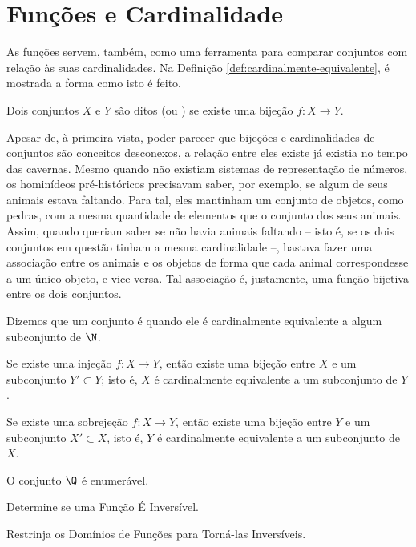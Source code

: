 \section{Funções e Cardinalidade}

As funções servem, também, como uma ferramenta para comparar conjuntos com relação às suas cardinalidades.
Na Definição \ref{def:cardinalmente-equivalente}, é mostrada a forma como isto é feito.

\begin{definition}
\label{def:cardinalmente-equivalente}
Dois conjuntos $X$ e $Y$ são ditos 
(ou ) se existe uma bijeção $f : X \to Y$.
\end{definition}

Apesar de, à primeira vista, poder parecer que bijeções e cardinalidades de conjuntos são conceitos desconexos, a relação entre eles existe já existia no tempo das cavernas.
Mesmo quando não existiam sistemas de representação de números, os hominídeos pré-históricos precisavam saber, por exemplo, se algum de seus animais estava faltando. 
Para tal, eles mantinham um conjunto de objetos, como pedras, com a mesma quantidade de elementos que o conjunto dos seus animais.
Assim, quando queriam saber se não havia animais faltando -- isto é, se os dois conjuntos em questão tinham a mesma cardinalidade --, bastava fazer uma associação entre os animais e os objetos de forma que cada animal correspondesse a um único objeto, e vice-versa.
Tal associação é, justamente, uma função bijetiva entre os dois conjuntos.

\begin{definition}
Dizemos que um conjunto é  quando ele é cardinalmente equivalente a algum subconjunto de $\N$.
\end{definition}

\begin{theorem}
Se existe uma injeção $f: X \to Y$, então existe uma bijeção entre $X$ e um subconjunto $Y' \subset Y$; isto é, $X$ é cardinalmente
equivalente a um subconjunto de $Y$.
\end{theorem}

\begin{theorem}
Se existe uma sobrejeção $f : X \to Y$, então existe uma bijeção entre $Y$ e um subconjunto $X' \subset X$, isto é, $Y$ é
cardinalmente equivalente a um subconjunto de $X$.
\end{theorem}

\begin{example}
    O conjunto $\Q$ é enumerável.
\end{example}

\begin{onlineact}
    {Determine se uma Função É Inversível}.
\end{onlineact}

\begin{onlineact}
    {Restrinja os Domínios de Funções para Torná-las Inversíveis}.
\end{onlineact}
